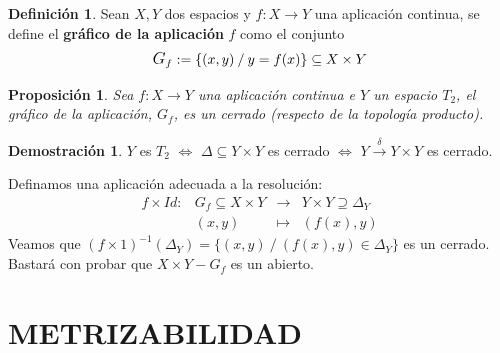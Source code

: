\documentclass[12pt,twoside]{report}
\theoremstyle{azul}
\theoremstyle{azul2}
\theoremstyle{plain}
\newtheorem*{prop}{Proposición}
\theoremstyle{definition}
\newtheorem*{defi}{Definición}
\newtheorem*{dem}{Demostración}
\theoremstyle{remark}
\begin{document}
\begin{defi}
Sean $X, Y$ dos espacios y $f : X \longrightarrow Y$ una aplicación continua, se define el \textbf{gráfico de la aplicación} $f$ como el conjunto 
$$\mathlarger{G}_f := \{(x,y) \: / \: y = f(x) \} \subseteq X \times Y$$
\end{defi}
\begin{prop}
Sea $f : X \longrightarrow Y$ una aplicación continua e $Y$ un espacio $T_2$, el gráfico de la aplicación, $G_f$, es un cerrado (respecto de la topología producto).
\end{prop}
\begin{dem}
$Y$ es $T_2$ $\Leftrightarrow$ $\Delta \subseteq Y \times Y$ es cerrado $\Leftrightarrow$ $Y \stackrel{\delta}{\longrightarrow} Y \times Y$ es cerrado.

Definamos una aplicación adecuada a la resolución:
$$\begin{array}{rrcl}
    f \times Id: & G_f \subseteq X \times Y & \longrightarrow & Y \times Y \supseteq \Delta_Y\\
    \: & (x,y) & \longmapsto & (f(x), y)
\end{array}$$
Veamos que $(f \times 1)^{-1}(\Delta_Y)=\{(x,y) \: / \: (f(x),y) \in \Delta_Y \}$ es un cerrado. Bastará con probar que $X \times Y - G_f$ es un abierto.
\end{dem}

\chapter{METRIZABILIDAD}
\end{document}
